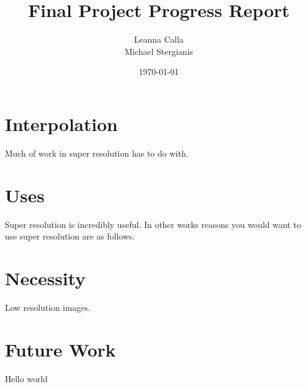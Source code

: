 \documentclass{article}
\title{Final Project Progress Report}
\author{Leanna Calla\\Michael Stergianis}
\date{\today}
\begin{document}
\maketitle
\section{Interpolation}
\label{sec:interpolation}
Much of work in super resolution has to do with. 
%
%
\section{Uses}
\label{sec:uses}
Super resolution is incredibly useful. In other works \cite{Yang2010ImageSH} reasons you
would want to use super resolution are as follows.
%
%
\section{Necessity}
\label{sec:necessity}
Low resolution images.
%
%
\section{Future Work}
\label{sec:future}
Hello world
%
\printbibliography
\end{document}
